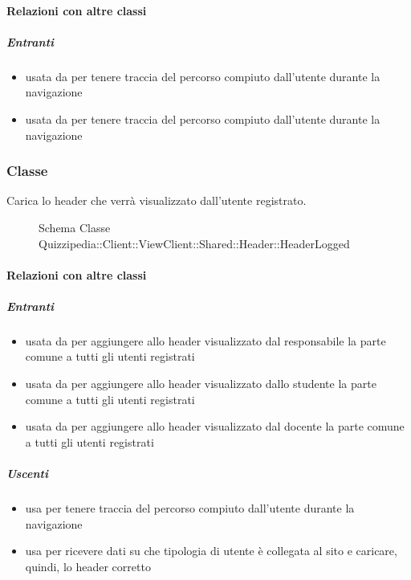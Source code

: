 \paragraph{Relazioni con altre classi}
\subparagraph{Entranti}
\begin{itemize}
\item usata da  per tenere traccia del percorso compiuto dall'utente durante la navigazione
\item usata da  per tenere traccia del percorso compiuto dall'utente durante la navigazione
\end{itemize}
\subsubsection{Classe }
Carica lo header che verrà visualizzato dall'utente registrato.
\begin{figure}[H]
\centering
\noindent{}
\caption[Schema Classe HeaderLogged]{Schema Classe Quizzipedia::Client::ViewClient::Shared::Header::HeaderLogged}
\end{figure}
\paragraph{Relazioni con altre classi}
\subparagraph{Entranti}
\begin{itemize}
\item usata da  per aggiungere allo header visualizzato dal responsabile la parte comune a tutti gli utenti registrati
\item usata da  per aggiungere allo header visualizzato dallo studente la parte comune a tutti gli utenti registrati
\item usata da  per aggiungere allo header visualizzato dal docente la parte comune a tutti gli utenti registrati
\end{itemize}
\subparagraph{Uscenti}
\begin{itemize}
\item usa  per tenere traccia del percorso compiuto dall'utente durante la navigazione
\item usa  per ricevere dati su che tipologia di utente è collegata al sito e caricare, quindi, lo header corretto
\end{itemize}

